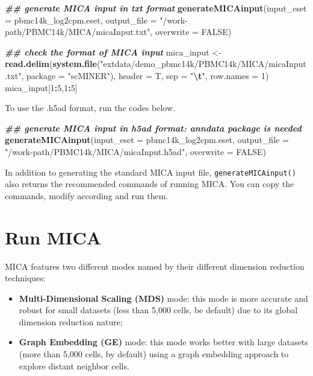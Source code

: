 \documentclass[
  12pt,
]{book}
\newenvironment{Shaded}{\begin{snugshade}}{\end{snugshade}}
\newcommand{\AttributeTok}[1]{\textcolor[rgb]{0.13,0.29,0.53}{#1}}
\newcommand{\ConstantTok}[1]{\textcolor[rgb]{0.56,0.35,0.01}{#1}}
\newcommand{\DecValTok}[1]{\textcolor[rgb]{0.00,0.00,0.81}{#1}}
\newcommand{\DocumentationTok}[1]{\textcolor[rgb]{0.56,0.35,0.01}{\textbf{\textit{#1}}}}
\newcommand{\FunctionTok}[1]{\textcolor[rgb]{0.13,0.29,0.53}{\textbf{#1}}}
\newcommand{\NormalTok}[1]{#1}
\newcommand{\OtherTok}[1]{\textcolor[rgb]{0.56,0.35,0.01}{#1}}
\newcommand{\SpecialCharTok}[1]{\textcolor[rgb]{0.81,0.36,0.00}{\textbf{#1}}}
\newcommand{\StringTok}[1]{\textcolor[rgb]{0.31,0.60,0.02}{#1}}
\providecommand{\tightlist}{%
  \setlength{\itemsep}{0pt}\setlength{\parskip}{0pt}}
\begin{document}
\begin{Shaded}
\begin{Highlighting}[]
\DocumentationTok{\#\# generate MICA input in txt format}
\FunctionTok{generateMICAinput}\NormalTok{(}\AttributeTok{input\_eset =}\NormalTok{ pbmc14k\_log2cpm.eset, }\AttributeTok{output\_file =} \StringTok{"/work{-}path/PBMC14k/MICA/micaInput.txt"}\NormalTok{, }\AttributeTok{overwrite =} \ConstantTok{FALSE}\NormalTok{)}

\DocumentationTok{\#\# check the format of MICA input}
\NormalTok{mica\_input }\OtherTok{\textless{}{-}} \FunctionTok{read.delim}\NormalTok{(}\FunctionTok{system.file}\NormalTok{(}\StringTok{"extdata/demo\_pbmc14k/PBMC14k/MICA/micaInput.txt"}\NormalTok{, }\AttributeTok{package =} \StringTok{"scMINER"}\NormalTok{), }\AttributeTok{header =}\NormalTok{ T, }\AttributeTok{sep =} \StringTok{"}\SpecialCharTok{\textbackslash{}t}\StringTok{"}\NormalTok{, }\AttributeTok{row.names =} \DecValTok{1}\NormalTok{)}
\NormalTok{mica\_input[}\DecValTok{1}\SpecialCharTok{:}\DecValTok{5}\NormalTok{,}\DecValTok{1}\SpecialCharTok{:}\DecValTok{5}\NormalTok{]}
\end{Highlighting}
\end{Shaded}

To use the .h5ad format, run the codes below.

\begin{Shaded}
\begin{Highlighting}[]
\DocumentationTok{\#\# generate MICA input in h5ad format: anndata package is needed}
\FunctionTok{generateMICAinput}\NormalTok{(}\AttributeTok{input\_eset =}\NormalTok{ pbmc14k\_log2cpm.eset, }\AttributeTok{output\_file =} \StringTok{"/work{-}path/PBMC14k/MICA/micaInput.h5ad"}\NormalTok{, }\AttributeTok{overwrite =} \ConstantTok{FALSE}\NormalTok{)}
\end{Highlighting}
\end{Shaded}

In addition to generating the standard MICA input file, \texttt{generateMICAinput()} also returns the recommended commands of running MICA. You can copy the commands, modify according and run them.

\section{Run MICA}\label{run-mica}

MICA features two different modes named by their different dimension reduction techniques:

\begin{itemize}
\tightlist
\item
  \textbf{Multi-Dimensional Scaling (MDS)} mode: this mode is more accurate and robust for small datasets (less than 5,000 cells, be default) due to its global dimension reduction nature;
\item
  \textbf{Graph Embedding (GE)} mode: this mode works better with large datasets (more than 5,000 cells, by default) using a graph embedding approach to explore distant neighbor cells.
\end{itemize}
\end{document}
